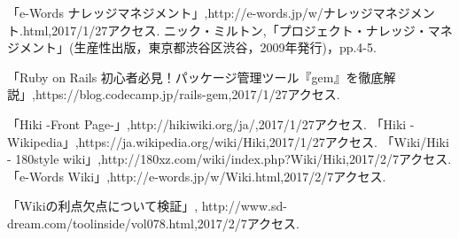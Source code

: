 \begin{thebibliography}{8}
「e-Words ナレッジマネジメント」,{http://e-words.jp/w/ナレッジマネジメント.html},2017/1/27アクセス.
ニック・ミルトン,「プロジェクト・ナレッジ・マネジメント」(生産性出版，東京都渋谷区渋谷，2009年発行)，pp.4-5.
\begin{flushleft}
「Ruby on Rails 初心者必見！パッケージ管理ツール『gem』を徹底解説」,{https://blog.codecamp.jp/rails-gem},2017/1/27アクセス.
\end{flushleft}
「Hiki -Front Page-」,{http://hikiwiki.org/ja/},2017/1/27アクセス.
「Hiki -Wikipedia」,{https://ja.wikipedia.org/wiki/Hiki},2017/1/27アクセス.
「Wiki/Hiki - 180style wiki」,{http://180xz.com/wiki/index.php?Wiki/Hiki},2017/2/7アクセス.
「e-Words Wiki」,{http://e-words.jp/w/Wiki.html},2017/2/7アクセス.
\begin{flushleft}
「Wikiの利点欠点について検証」,
{http://www.sd-dream.com/toolinside/vol078.html},2017/2/7アクセス.
\end{flushleft}
\end{thebibliography}
